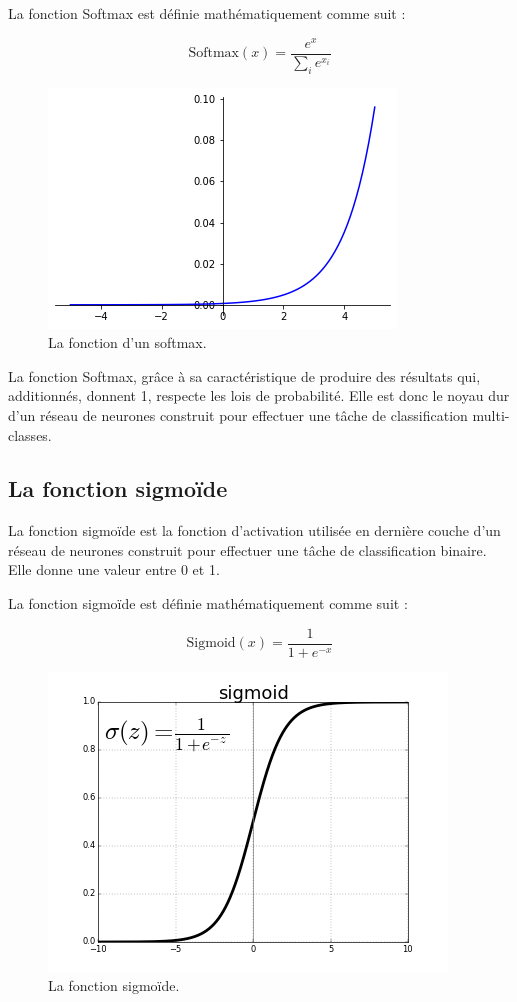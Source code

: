 La fonction Softmax est définie mathématiquement comme suit :

\[ \text{Softmax}(x) = \frac{e^{x}}{\sum_{i} e^{x_i}} \]


\begin{figure}[h]
\centering
\includegraphics[scale=0.5]{Images/Softmax.png}
\caption{La fonction d'un softmax.}
\label{fig:12}
\end{figure}

La fonction Softmax, grâce à sa caractéristique de produire des résultats qui, additionnés, donnent 1, respecte les lois de probabilité. Elle est donc le noyau dur d’un réseau de neurones construit pour effectuer une tâche de classification multi-classes.

\subsection{La fonction sigmoïde }
La fonction sigmoïde est la fonction d'activation utilisée en dernière couche d'un réseau de neurones construit pour effectuer une tâche de classification binaire. Elle donne une valeur entre 0 et 1.

La fonction sigmoïde est définie mathématiquement comme suit :

\[ \text{Sigmoid}(x) = \frac{1}{1 + e^{-x}}\]
\begin{figure}[h]
\centering
\includegraphics[scale=0.5]{Images/sigmoid.png}
\caption{La fonction sigmoïde.}
\label{fig:13}
\end{figure}

